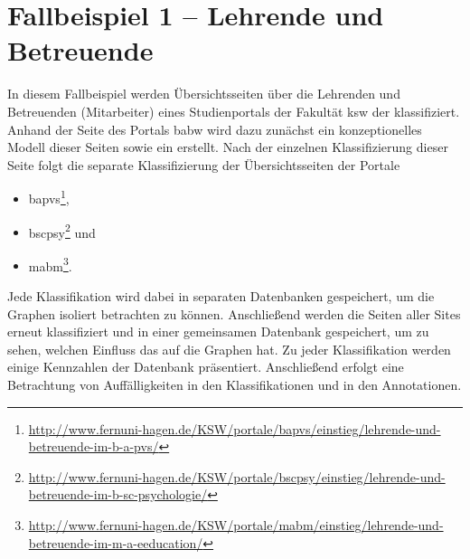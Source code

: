 \section{Fallbeispiel 1 -- Lehrende und Betreuende}
    \label{section:findingsCaseStudy1}
    In diesem Fallbeispiel werden Übersichtsseiten
    über die Lehrenden und Betreuenden (Mitarbeiter) eines Studienportals
    der Fakultät \gls{ksw} der {\fernUni} klassifiziert.
    Anhand der Seite des Portals \gls{babw} wird dazu zunächst ein
    konzeptionelles Modell dieser Seiten sowie ein {\classificationModel} erstellt.
    Nach der einzelnen Klassifizierung dieser Seite folgt die separate Klassifizierung
    der Übersichtsseiten der Portale

    \begin{itemize}
        \item \gls{bapvs}\footnote{\url{http://www.fernuni-hagen.de/KSW/portale/bapvs/einstieg/lehrende-und-betreuende-im-b-a-pvs/}},
        \item \gls{bscpsy}\footnote{\url{http://www.fernuni-hagen.de/KSW/portale/bscpsy/einstieg/lehrende-und-betreuende-im-b-sc-psychologie/}} und
        \item \gls{mabm}\footnote{\url{http://www.fernuni-hagen.de/KSW/portale/mabm/einstieg/lehrende-und-betreuende-im-m-a-eeducation/}}.
    \end{itemize}

    Jede Klassifikation wird dabei in separaten Datenbanken gespeichert,
    um die Graphen isoliert betrachten zu können.
    Anschließend werden die Seiten aller Sites erneut klassifiziert und in
    einer gemeinsamen Datenbank gespeichert,
    um zu sehen, welchen Einfluss das auf die Graphen hat.
    Zu jeder Klassifikation werden einige Kennzahlen der Datenbank präsentiert.
    Anschließend erfolgt eine Betrachtung von Auffälligkeiten in den Klassifikationen und in den Annotationen.

    
    
    
    
    
    
    
    
